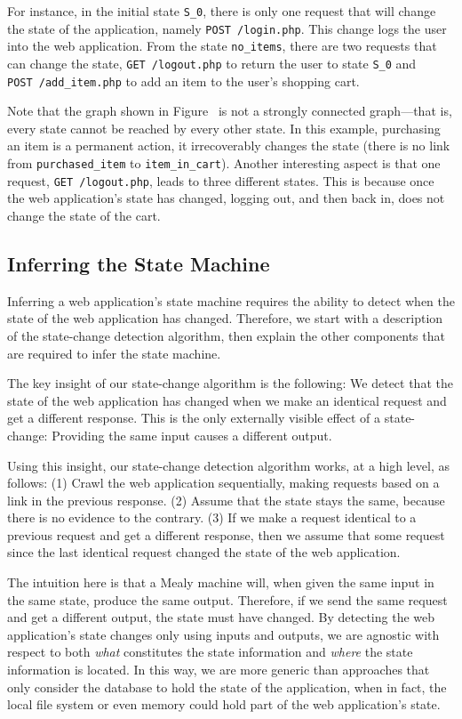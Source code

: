 For instance, in the initial state \texttt{S\_0}, there is only one request that
will change the state of the application, namely \texttt{POST~/login.php}. This
change logs the user into the web application. From the state
\texttt{no\_items}, there are two requests that can change the state,
\texttt{GET~/logout.php} to return the user to state \texttt{S\_0} and
\texttt{POST~/add\_item.php} to add an item to the user's shopping cart.

Note that the graph shown in Figure~ is not a
strongly connected graph---that is, every state cannot be reached by every
other state. In this example, purchasing an item is a permanent action, it
irrecoverably changes the state (there is no link from
\texttt{purchased\_item} to \texttt{item\_in\_cart}). Another interesting
aspect is that one request, \texttt{GET~/logout.php}, leads to three different
states. This is because once the web application's state has changed, 
logging out, and then back in, does not change the state of the cart.

\subsection{Inferring the State Machine}

Inferring a web application's state machine requires the ability to detect when
the state of the web application has changed. Therefore, we start with a
description of the state-change detection algorithm, then explain the other
components that are required to infer the state machine. 

The key insight of our state-change algorithm is the following: We detect
that the state of the web application has changed when we make an identical
request and get a different response. This is the only externally visible
effect of a state-change: Providing the same input causes a different output.

Using this insight, our state-change detection algorithm works, at a high level,
as follows: (1) Crawl the web application sequentially, making requests based on
a link in the previous response. (2) Assume that the state stays the same,
because there is no evidence to the contrary. (3) If we make a request identical
to a previous request and get a different response, then we assume that some
request since the last identical request changed the state of the web
application.

The intuition here is that a Mealy machine will, when given the same input in
the same state, produce the same output. Therefore, if we send the same request
and get a different output, the state must have changed. By detecting the web
application's state changes only using inputs and outputs, we are agnostic with
respect to both \emph{what} constitutes the state information and \emph{where}
the state information is located. In this way, we are more generic than
approaches that only consider the database to hold the state of the
application, when in fact, the local file system or even memory could hold part
of the web application's state.

